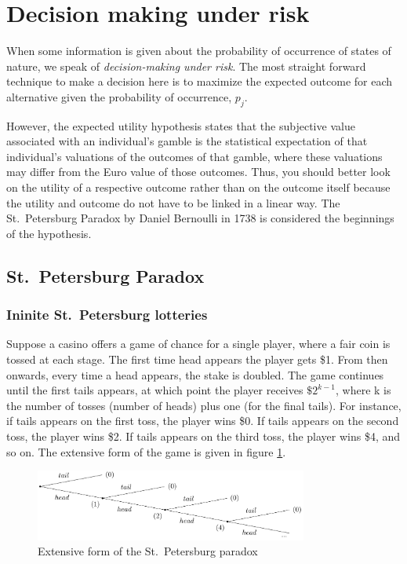 \documentclass[
  12pt,
  oneside]{book}
\theoremstyle{definition}
\theoremstyle{definition}
\theoremstyle{definition}
\theoremstyle{definition}
\theoremstyle{remark}
\begin{document}
\section{Decision making under risk}\label{decision-making-under-risk}

When some information is given about the probability of occurrence of states of nature, we speak of \emph{decision-making under risk}. The most straight forward technique to make a decision here is to maximize the expected outcome for each alternative given the probability of occurrence, \(p_j\).

However, the expected utility hypothesis states that the subjective value associated with an individual's gamble is the statistical expectation of that individual's valuations of the outcomes of that gamble, where these valuations may differ from the Euro value of those outcomes. Thus, you should better look on the utility of a respective outcome rather than on the outcome itself because the utility and outcome do not have to be linked in a linear way. The St.~Petersburg Paradox by Daniel Bernoulli in 1738 is considered the beginnings of the hypothesis.

\subsection{St.~Petersburg Paradox}\label{st.-petersburg-paradox}

\subsubsection{Ininite St.~Petersburg lotteries}\label{ininite-st.-petersburg-lotteries}

Suppose a casino offers a game of chance for a single player, where a fair coin is tossed at each stage. The first time head appears the player gets \$1. From then onwards, every time a head appears, the stake is doubled. The game continues until the first tails appears, at which point the player receives \(\$ 2^{k-1}\), where k is the number of tosses (number of heads) plus one (for the final tails).
For instance, if tails appears on the first toss, the player wins \$0. If tails appears on the second toss, the player wins \$2. If tails appears on the third toss, the player wins \$4, and so on. The extensive form of the game is given in figure \ref{fig:spextensiveform}.

\begin{figure}
\centering
\includegraphics[width=0.8\textwidth,height=\textheight]{fig/spextensiveform.png}
\caption{\label{fig:spextensiveform} Extensive form of the St.~Petersburg paradox}
\end{figure}
\end{document}
